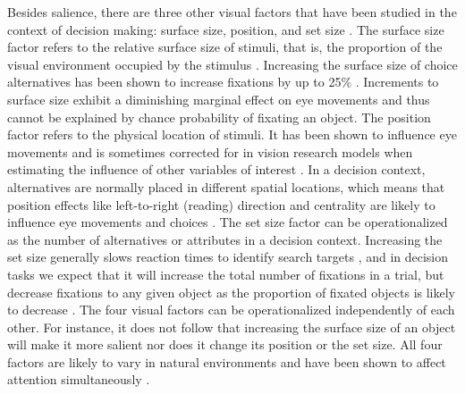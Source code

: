 Besides salience, there are three other visual factors that have been studied in the context of decision making: surface size, position, and set size \citep{orquin2013a, wedel2008}. The surface size factor refers to the relative surface size of stimuli, that is, the proportion of the visual environment occupied by the stimulus \citep[for a review see][]{peschel2013a}. Increasing the surface size of choice alternatives has been shown to increase fixations by up to 25\% \citep{chandon2009a}. Increments to surface size exhibit a diminishing marginal effect on eye movements \citep{lohse1997a} and thus cannot be explained by chance probability of fixating an object. The position factor refers to the physical location of stimuli. It has been shown to influence eye movements and is sometimes corrected for in vision research models when estimating the influence of other variables of interest \citep{clarke2014a}. In a decision context, alternatives are normally placed in different spatial locations, which means that position effects like left-to-right (reading) direction and centrality are likely to influence eye movements and choices \citep{atalay2012a, meissner2016a}. The set size factor can be operationalized as the number of alternatives or attributes in a decision context. Increasing the set size generally slows reaction times to identify search targets \citep{wolfe2010}, and in decision tasks we expect that it will increase the total number of fixations in a trial, but decrease fixations to any given object as the proportion of fixated objects is likely to decrease \citep{spinks2016a}. The four visual factors can be operationalized independently of each other. For instance, it does not follow that increasing the surface size of an object will make it more salient nor does it change its position or the set size. All four factors are likely to vary in natural environments and have been shown to affect attention simultaneously \citep{gidloef2017a, orquin2019a}. \\

